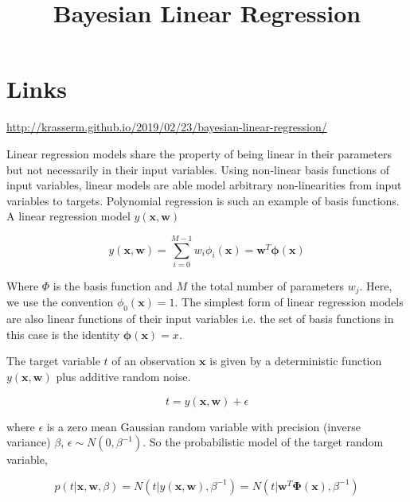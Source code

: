 \documentclass[a4paper,10pt]{article}
\title{Bayesian Linear Regression}
\author{}
\begin{document}
\maketitle

\begin{abstract}

\end{abstract}

\section{Links}

\url{http://krasserm.github.io/2019/02/23/bayesian-linear-regression/}


Linear regression models share the property of being linear in their parameters but not necessarily in their input variables.
Using non-linear basis functions of input variables, linear models are able model arbitrary non-linearities from input variables to targets.  
Polynomial regression is such an example of basis functions.
A linear regression model $y(\bm{x},\bm{w})$

\begin{equation}
y(\bm{x},\bm{w}) = \sum_{i=0}^{M-1} w_i \phi_i(\bm{x}) = \bm{w}^T \bm{\phi}(\bm{x})
\end{equation}

Where $\Phi$ is the basis function and $M$ the total number of parameters $w_j$.
Here, we use the convention $\phi_0(\bm{x})=1$.
The simplest form of linear regression models are also linear functions of their input variables i.e. the set of basis functions in this case is the identity $\bm{\phi}(\bm{x})=x$. 

The target variable $t$ of an observation $\bm{x}$ is given by a deterministic function $y(\bm{x},\bm{w})$ plus additive random noise.

\begin{equation}
 t = y(\bm{x},\bm{w}) + \epsilon
\end{equation}

where $\epsilon$ is a zero mean Gaussian random variable with precision (inverse variance) $\beta$, $\epsilon \sim N(0,\beta^{-1})$.
So the probabilistic model of the target random variable,

\begin{equation}
p(t | \bm{x}, \bm{w}, \beta) = N(t | y(\bm{x},\bm{w}), \beta^{-1}) = N(t | \bm{w}^T \bm{\Phi}(\bm{x}) , \beta^{-1})
\end{equation}
\end{document}
